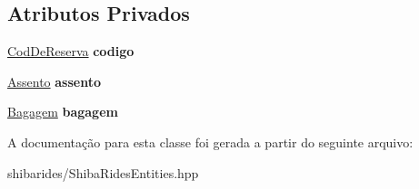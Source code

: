 \subsection*{Atributos Privados}
\begin{DoxyCompactItemize}
\item 
\hyperlink{classshibarides_1_1CodDeReserva}{Cod\+De\+Reserva} {\bfseries codigo}\hypertarget{classshibarides_1_1Reserva_a2f7eaae7c2f5378ff302d5ae2b5fbb40}{}\label{classshibarides_1_1Reserva_a2f7eaae7c2f5378ff302d5ae2b5fbb40}

\item 
\hyperlink{classshibarides_1_1Assento}{Assento} {\bfseries assento}\hypertarget{classshibarides_1_1Reserva_a7d97d0663be20fdcf657163c5a6d080c}{}\label{classshibarides_1_1Reserva_a7d97d0663be20fdcf657163c5a6d080c}

\item 
\hyperlink{classshibarides_1_1Bagagem}{Bagagem} {\bfseries bagagem}\hypertarget{classshibarides_1_1Reserva_a1f432400419baf386812117ce49990e6}{}\label{classshibarides_1_1Reserva_a1f432400419baf386812117ce49990e6}

\end{DoxyCompactItemize}


A documentação para esta classe foi gerada a partir do seguinte arquivo\+:\begin{DoxyCompactItemize}
\item 
shibarides/Shiba\+Rides\+Entities.\+hpp\end{DoxyCompactItemize}
